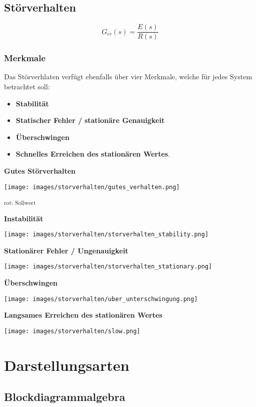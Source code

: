 \documentclass[
  10pt,
  a4paper,
  twocolumn]{article}
\providecommand{\tightlist}{%
  \setlength{\itemsep}{0pt}\setlength{\parskip}{0pt}}\usepackage{longtable,booktabs,array}
\numberwithin{equation}{section}
\begin{document}
\subsection{Störverhalten}\label{stuxf6rverhalten}

\[
G_{er}(s)=\frac{E(s)}{R(s)}
\]

\subsubsection{Merkmale}\label{merkmale-1}

Das Störverhlaten verfügt ebenfalls über vier Merkmale, welche für jedes
System betrachtet soll:

\begin{itemize}
\tightlist
\item
  \textbf{Stabilität}
\item
  \textbf{Statischer Fehler /} \textbf{stationäre Genauigkeit}
\item
  \textbf{Überschwingen}
\item
  \textbf{Schnelles Erreichen des stationären Wertes}.
\end{itemize}

\textbf{Gutes Störverhalten}

\texttt{[image: images/storverhalten/gutes\_verhalten.png]}

\textsuperscript{rot: Sollwert}

\textbf{Instabilität}

\texttt{[image: images/storverhalten/storverhalten\_stability.png]}

\textbf{Stationärer Fehler / Ungenauigkeit}

\texttt{[image: images/storverhalten/storverhalten\_stationary.png]}

\textbf{Überschwingen}

\texttt{[image: images/storverhalten/uber\_unterschwingung.png]}

\textbf{Langsames Erreichen des stationären Wertes}

\texttt{[image: images/storverhalten/slow.png]}

\section{Darstellungsarten}\label{darstellungsarten}

\subsection{Blockdiagrammalgebra}\label{blockdiagrammalgebra}
\end{document}
